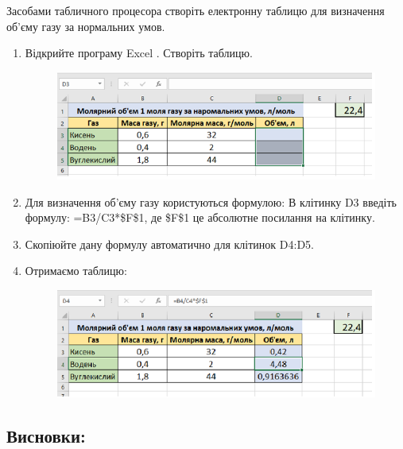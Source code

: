 \documentclass{article}
\begin{document}
	Засобами табличного процесора створіть електронну таблицю для визначення об'єму газу за нормальних умов.
	\begin{enumerate}
		\item Відкрийте програму Excel . Створіть таблицю.
		\begin{figure}[h]
			\centering
			\includegraphics[width=0.8\linewidth]{Excel1.png}
		\end{figure}
		\item Для визначення об’єму газу користуються формулою: 
		В клітинку D3 введіть формулу: =B3/C3*\$F\$1, де  \$F\$1 це  абсолютне посилання на клітинку.
		\item Скопіюйте дану формулу автоматично для клітинок D4:D5.
		\newpage
		\item Отримаємо таблицю:
		\begin{figure}[h]
			\centering
			\includegraphics[width=0.8\linewidth]{Excel2.png}
		\end{figure}
	\end{enumerate}
	\subsection*{\textbf{Висновки: }}
\end{document}

